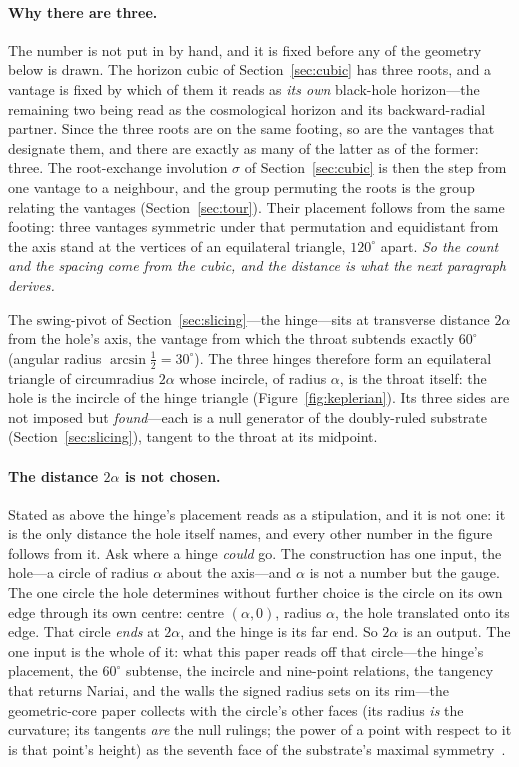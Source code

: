 \documentclass[11pt,a4paper]{article}
\theoremstyle{definition}
\begin{document}
\paragraph{Why there are three.} The number is not put in by hand, and it is fixed before any of the geometry below is drawn. The horizon cubic of Section~\ref{sec:cubic} has three roots, and a vantage is fixed by which of them it reads as \emph{its own} black-hole horizon---the remaining two being read as the cosmological horizon and its backward-radial partner. Since the three roots are on the same footing, so are the vantages that designate them, and there are exactly as many of the latter as of the former: three. The root-exchange involution $\sigma$ of Section~\ref{sec:cubic} is then the step from one vantage to a neighbour, and the group permuting the roots is the group relating the vantages (Section~\ref{sec:tour}). Their placement follows from the same footing: three vantages symmetric under that permutation and equidistant from the axis stand at the vertices of an equilateral triangle, $120^{\circ}$ apart. \emph{So the count and the spacing come from the cubic, and the distance is what the next paragraph derives.}

The swing-pivot of Section~\ref{sec:slicing}---the hinge---sits at transverse distance $2\alpha$ from the hole's axis, the vantage from which the throat subtends exactly $60^{\circ}$ (angular radius $\arcsin\tfrac12=30^{\circ}$). The three hinges therefore form an equilateral triangle of circumradius $2\alpha$ whose incircle, of radius $\alpha$, is the throat itself: the hole is the incircle of the hinge triangle (Figure~\ref{fig:keplerian}). Its three sides are not imposed but \emph{found}---each is a null generator of the doubly-ruled substrate (Section~\ref{sec:slicing}), tangent to the throat at its midpoint.

\paragraph{The distance $2\alpha$ is not chosen.} Stated as above the hinge's placement reads as a stipulation, and it is not one: it is the only distance the hole itself names, and every other number in the figure follows from it. Ask where a hinge \emph{could} go. The construction has one input, the hole---a circle of radius $\alpha$ about the axis---and $\alpha$ is not a number but the gauge. The one circle the hole determines without further choice is the circle on its own edge through its own centre: centre $(\alpha,0)$, radius $\alpha$, the hole translated onto its edge. That circle \emph{ends} at $2\alpha$, and the hinge is its far end. So $2\alpha$ is an output. The one input is the whole of it: what this paper reads off that circle---the hinge's placement, the $60^{\circ}$ subtense, the incircle and nine-point relations, the tangency that returns Nariai, and the walls the signed radius sets on its rim---the geometric-core paper collects with the circle's other faces (its radius \emph{is} the curvature; its tangents \emph{are} the null rulings; the power of a point with respect to it is that point's height) as the seventh face of the substrate's maximal symmetry~\cite{JanzenGeometricCore}.
\end{document}
